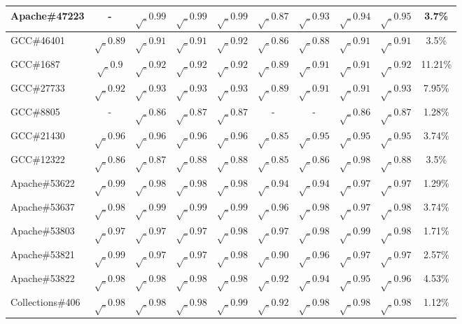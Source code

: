 \begin{table}[h!]
\begin{tabular}{lccccccccc}
    Apache\#47223     & -  & $\surd_{0.99}$ & $\surd_{0.99}$ & $\surd_{0.99}$ &$\surd_{0.87}$ & $\surd_{0.93}$ & $\surd_{0.94}$ & $\surd_{0.95}$ & 3.7\% \\
    \midrule
    GCC\#46401       & $\surd_{0.89}$  & $\surd_{0.91}$ & $\surd_{0.91}$ & $\surd_{0.92}$ & $\surd_{0.86}$ & $\surd_{0.88}$ & $\surd_{0.91}$ & $\surd_{0.91}$ & 3.5\% \\
    GCC\#1687        & $\surd_{0.9}$  & $\surd_{0.92}$ & $\surd_{0.92}$ & $\surd_{0.92}$ & $\surd_{0.89}$ & $\surd_{0.91}$ & $\surd_{0.91}$ & $\surd_{0.92}$ & 11.21\% \\
    GCC\#27733       & $\surd_{0.92}$  & $\surd_{0.93}$ & $\surd_{0.93}$ & $\surd_{0.93}$ & $\surd_{0.89}$ & $\surd_{0.91}$ & $\surd_{0.91}$ & $\surd_{0.93}$ & 7.95\% \\
    GCC\#8805        & -  & $\surd_{0.86}$ &$\surd_{0.87}$ &$\surd_{0.87}$ & - & - & $\surd_{0.86}$ &$\surd_{0.87}$ & 1.28\% \\
    GCC\#21430       & $\surd_{0.96}$  & $\surd_{0.96}$ & $\surd_{0.96}$ & $\surd_{0.96}$ & $\surd_{0.85}$ & $\surd_{0.95}$ & $\surd_{0.95}$ & $\surd_{0.95}$ & 3.74\% \\
    GCC\#12322       & $\surd_{0.86}$  &$\surd_{0.87}$ & $\surd_{0.88}$ & $\surd_{0.88}$ & $\surd_{0.85}$ & $\surd_{0.86}$ & $\surd_{0.98}$ & $\surd_{0.88}$ & 3.5\% \\
    \midrule
    \midrule
    Apache\#53622      & $\surd_{0.99}$  & $\surd_{0.98}$ & $\surd_{0.98}$ & $\surd_{0.98}$ & $\surd_{0.94}$ & $\surd_{0.94}$ & $\surd_{0.97}$ & $\surd_{0.97}$ & 1.29\% \\
    Apache\#53637     & $\surd_{0.98}$  & $\surd_{0.99}$ & $\surd_{0.99}$ & $\surd_{0.99}$ & $\surd_{0.96}$ & $\surd_{0.98}$ & $\surd_{0.97}$ & $\surd_{0.98}$ & 3.74\% \\
    Apache\#53803      & $\surd_{0.97}$  & $\surd_{0.97}$ & $\surd_{0.97}$ & $\surd_{0.98}$ & $\surd_{0.97}$ & $\surd_{0.98}$ & $\surd_{0.99}$ & $\surd_{0.98}$ & 1.71\% \\
    Apache\#53821      & $\surd_{0.99}$  & $\surd_{0.97}$ & $\surd_{0.97}$ & $\surd_{0.98}$ & $\surd_{0.90}$ & $\surd_{0.96}$ & $\surd_{0.97}$ & $\surd_{0.97}$ & 2.57\% \\
    Apache\#53822      & $\surd_{0.98}$  & $\surd_{0.98}$ & $\surd_{0.98}$ & $\surd_{0.98}$ & $\surd_{0.92}$ & $\surd_{0.94}$ & $\surd_{0.95}$ & $\surd_{0.96}$ & 4.53\% \\
    \midrule
    Collections\#406    & $\surd_{0.98}$  & $\surd_{0.98}$ & $\surd_{0.98}$ & $\surd_{0.99}$ & $\surd_{0.92}$ & $\surd_{0.98}$ & $\surd_{0.98}$ & $\surd_{0.98}$ & 1.12\% \\

\end{tabular}
\end{table}
